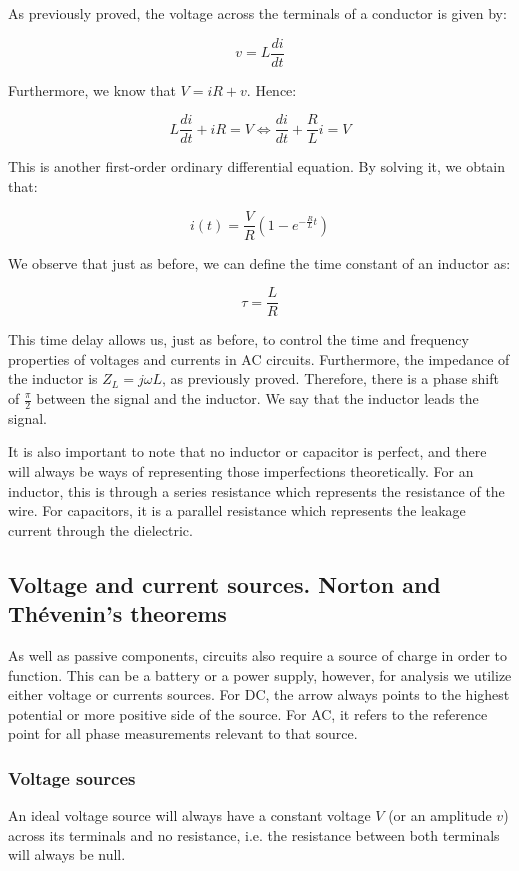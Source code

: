 \documentclass{article}
\begin{document}
As previously proved, the voltage across the terminals of a conductor is given by:

\[ v = L\frac{di}{dt} \]

Furthermore, we know that $V = iR + v$. Hence:

\[ L\frac{di}{dt} + iR = V \iff \frac{di}{dt} + \frac{R}{L}i = V \]

This is another first-order ordinary differential equation. By solving it, we obtain that:

\[ i(t) = \frac{V}{R}\left(1 - e^{-\frac{R}{L}t}\right) \]

We observe that just as before, we can define the time constant of an inductor as:

\[ \tau = \frac{L}{R} \]

This time delay allows us, just as before, to control the time and frequency properties of voltages and currents in AC circuits. Furthermore, the impedance of the inductor is $Z_L = j\omega L$, as previously proved. Therefore, there is a phase shift of $\frac{\pi}{2}$ between the signal and the inductor. We say that the inductor leads the signal.

It is also important to note that no inductor or capacitor is perfect, and there will always be ways of representing those imperfections theoretically. For an inductor, this is through a series resistance which represents the resistance of the wire. For capacitors, it is a parallel resistance which represents the leakage current through the dielectric.

\newpage

\subsection{Voltage and current sources. Norton and Thévenin's theorems}

As well as passive components, circuits also require a source of charge in order to function. This can be a battery or a power supply, however, for analysis we utilize either voltage or currents sources. For DC, the arrow always points to the highest potential or more positive side of the source. For AC, it refers to the reference point for all phase measurements relevant to that source.

\subsubsection{Voltage sources}

\begin{definition}
    An ideal voltage source will always have a constant voltage $V$ (or an amplitude $v$) across its terminals and no resistance, i.e. the resistance between both terminals will always be null.
\end{definition}
\end{document}
